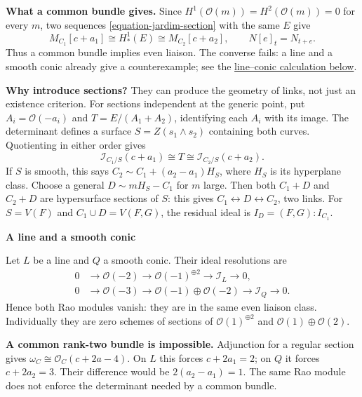 \textbf{What a common bundle gives.}
Since $H^1(\mathcal{O}(m))=
H^2(\mathcal{O}(m))=0$ for every $m$,
two sequences \eqref{equation-jardim-section}
with the same $E$ give
$$
M_{C_1}[c+a_1]\cong H^1_*(E)
\cong M_{C_2}[c+a_2],
\qquad N[e]_t=N_{t+e}.
$$
Thus a common bundle implies even
liaison. The converse fails: a line
and a smooth conic already give a
counterexample; see the
\hyperref[paragraph-jardim-line-conic]
{line--conic calculation below}.

\textbf{Why introduce sections?}
They can produce the geometry of links,
not just an existence criterion.
For sections independent at the
generic point,
put $A_i=\mathcal{O}(-a_i)$ and
$T=E/(A_1+A_2)$, identifying each $A_i$
with its image. The determinant defines
a surface $S=Z(s_1\wedge s_2)$ containing
both curves. Quotienting in either order
gives
$$
\mathcal{I}_{C_1/S}(c+a_1)
\cong T\cong
\mathcal{I}_{C_2/S}(c+a_2).
$$
If $S$ is smooth, this says
$C_2\sim C_1+(a_2-a_1)H_S$, where
$H_S$ is its hyperplane class.
Choose a general $D\sim mH_S-C_1$
for $m$ large. Then both $C_1+D$ and
$C_2+D$ are hypersurface sections of
$S$: this gives $C_1\leftrightarrow
D\leftrightarrow C_2$, two links.
For $S=V(F)$ and $C_1\cup D=V(F,G)$,
the residual ideal is
$I_D=(F,G):I_{C_1}$.

\medskip\noindent
{}
\label{paragraph-jardim-line-conic}
\textbf{A line and a smooth conic}
\par\nopagebreak\noindent
Let $L$ be a line and $Q$ a smooth conic.
Their ideal resolutions are
$$
\begin{aligned}
0&\to\mathcal{O}(-2)
\to\mathcal{O}(-1)^{\oplus2}
\to\mathcal{I}_L\to0,\\
0&\to\mathcal{O}(-3)
\to\mathcal{O}(-1)\oplus\mathcal{O}(-2)
\to\mathcal{I}_Q\to0.
\end{aligned}
$$
Hence both Rao modules vanish: they
are in the same even liaison class.
Individually they are zero schemes of
sections of $\mathcal{O}(1)^{\oplus2}$
and $\mathcal{O}(1)\oplus\mathcal{O}(2)$.

\textbf{A common rank-two bundle is
impossible.}
Adjunction for a regular section gives
$\omega_C\cong\mathcal{O}_C(c+2a-4)$.
On $L$ this forces $c+2a_1=2$;
on $Q$ it forces $c+2a_2=3$.
Their difference would be
$2(a_2-a_1)=1$.
The same Rao module does not enforce
the determinant needed by a common bundle.

